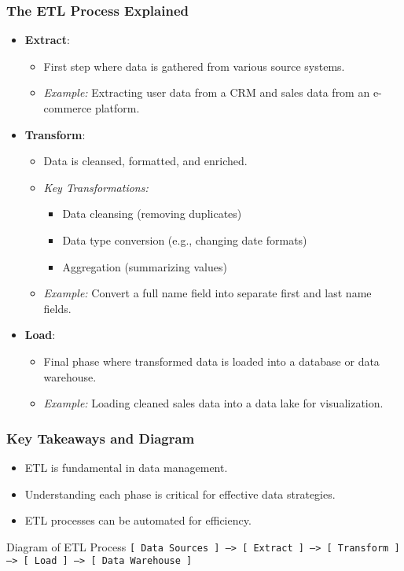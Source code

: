 \documentclass[aspectratio=169]{beamer}
\begin{document}
\begin{frame}[fragile]
    \frametitle{The ETL Process Explained}
    \begin{itemize}
        \item \textbf{Extract}:
            \begin{itemize}
                \item First step where data is gathered from various source systems.
                \item \textit{Example:} Extracting user data from a CRM and sales data from an e-commerce platform.
            \end{itemize}
        
        \item \textbf{Transform}:
            \begin{itemize}
                \item Data is cleansed, formatted, and enriched.
                \item \textit{Key Transformations:}
                    \begin{itemize}
                        \item Data cleansing (removing duplicates)
                        \item Data type conversion (e.g., changing date formats)
                        \item Aggregation (summarizing values)
                    \end{itemize}
                \item \textit{Example:} Convert a full name field into separate first and last name fields.
            \end{itemize}
        
        \item \textbf{Load}:
            \begin{itemize}
                \item Final phase where transformed data is loaded into a database or data warehouse.
                \item \textit{Example:} Loading cleaned sales data into a data lake for visualization.
            \end{itemize}
    \end{itemize}
\end{frame}

\begin{frame}[fragile]
    \frametitle{Key Takeaways and Diagram}
    \begin{itemize}
        \item ETL is fundamental in data management.
        \item Understanding each phase is critical for effective data strategies.
        \item ETL processes can be automated for efficiency.
    \end{itemize}

    \begin{block}{Diagram of ETL Process}
        \centering
        \texttt{[ Data Sources ] ---> [ Extract ] ---> [ Transform ] ---> [ Load ] ---> [ Data Warehouse ]}
    \end{block}
\end{frame}
\end{document}
